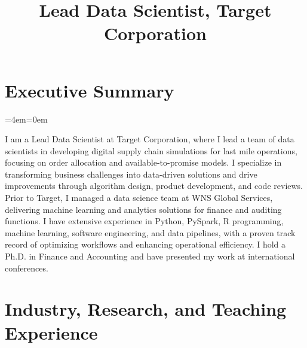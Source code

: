 \documentclass[11pt,a4paper,]{moderncv}
\title{Lead Data Scientist, Target Corporation}
\begin{document}
\makecvtitle



\newenvironment{smallblockquote}{%
  \par%
  \medskip
  \leftskip=2em\rightskip=0em%
  \noindent\ignorespaces}{%
  \par\medskip}

\newenvironment{blockquote}{%
  \par%
  \medskip
  \leftskip=4em\rightskip=0em%
  \noindent\ignorespaces}{%
  \par\medskip}

\hypertarget{executive-summary}{%
\section{Executive Summary}\label{executive-summary}}

\begingroup
\bgroup %
  \par%
  \medskip
  \leftskip=4em\rightskip=0em%
  \noindent\ignorespaces

I am a Lead Data Scientist at Target Corporation, where I lead a team of data scientists in developing digital supply chain simulations for last mile operations, focusing on order allocation and available-to-promise models. I specialize in transforming business challenges into data-driven solutions and drive improvements through algorithm design, product development, and code reviews. Prior to Target, I managed a data science team at WNS Global Services, delivering machine learning and analytics solutions for finance and auditing functions. I have extensive experience in Python, PySpark, R programming, machine learning, software engineering, and data pipelines, with a proven track record of optimizing workflows and enhancing operational efficiency. I hold a Ph.D. in Finance and Accounting and have presented my work at international conferences.

%
  \par\medskip\egroup 
\endgroup

\hypertarget{industry-research-and-teaching-experience}{%
\section{Industry, Research, and Teaching
Experience}\label{industry-research-and-teaching-experience}}
\end{document}

